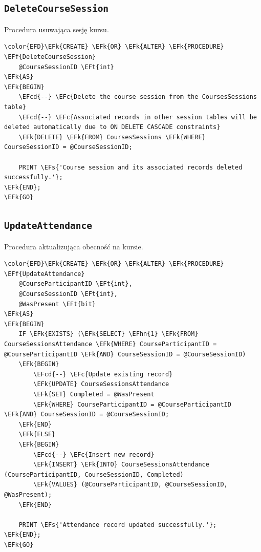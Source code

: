 \documentclass[11pt]{article}
\newcommand{\EFc}[1]{\textcolor{EFc}{\textit{#1}}} %
\newcommand{\EFcd}[1]{\textcolor{EFcd}{\textit{#1}}} %
\newcommand{\EFs}[1]{\textcolor{EFs}{#1}} %
\newcommand{\EFk}[1]{\textcolor{EFk}{\textbf{#1}}} %
\newcommand{\EFf}[1]{\textcolor{EFf}{#1}} %
\newcommand{\EFt}[1]{\textcolor{EFt}{\textbf{#1}}} %
\newcommand{\EFhn}[1]{\textcolor{EFhn}{#1}} %
\begin{document}
\subsection{\texttt{DeleteCourseSession}}
\label{sec:orgdb569d7}
Procedura usuwająca sesję kursu.
\begin{Code}
\begin{Verbatim}
\color{EFD}\EFk{CREATE} \EFk{OR} \EFk{ALTER} \EFk{PROCEDURE} \EFf{DeleteCourseSession}
    @CourseSessionID \EFt{int}
\EFk{AS}
\EFk{BEGIN}
    \EFcd{--} \EFc{Delete the course session from the CoursesSessions table}
    \EFcd{--} \EFc{Associated records in other session tables will be deleted automatically due to ON DELETE CASCADE constraints}
    \EFk{DELETE} \EFk{FROM} CoursesSessions \EFk{WHERE} CourseSessionID = @CourseSessionID;

    PRINT \EFs{'Course session and its associated records deleted successfully.'};
\EFk{END};
\EFk{GO}
\end{Verbatim}
\end{Code}
\subsection{\texttt{UpdateAttendance}}
\label{sec:org8abe484}
Procedura aktualizująca obecność na kursie.
\begin{Code}
\begin{Verbatim}
\color{EFD}\EFk{CREATE} \EFk{OR} \EFk{ALTER} \EFk{PROCEDURE} \EFf{UpdateAttendance}
    @CourseParticipantID \EFt{int},
    @CourseSessionID \EFt{int},
    @WasPresent \EFt{bit}
\EFk{AS}
\EFk{BEGIN}
    IF \EFk{EXISTS} (\EFk{SELECT} \EFhn{1} \EFk{FROM} CourseSessionsAttendance \EFk{WHERE} CourseParticipantID = @CourseParticipantID \EFk{AND} CourseSessionID = @CourseSessionID)
    \EFk{BEGIN}
        \EFcd{--} \EFc{Update existing record}
        \EFk{UPDATE} CourseSessionsAttendance
        \EFk{SET} Completed = @WasPresent
        \EFk{WHERE} CourseParticipantID = @CourseParticipantID \EFk{AND} CourseSessionID = @CourseSessionID;
    \EFk{END}
    \EFk{ELSE}
    \EFk{BEGIN}
        \EFcd{--} \EFc{Insert new record}
        \EFk{INSERT} \EFk{INTO} CourseSessionsAttendance (CourseParticipantID, CourseSessionID, Completed)
        \EFk{VALUES} (@CourseParticipantID, @CourseSessionID, @WasPresent);
    \EFk{END}

    PRINT \EFs{'Attendance record updated successfully.'};
\EFk{END};
\EFk{GO}
\end{Verbatim}
\end{Code}
\end{document}
